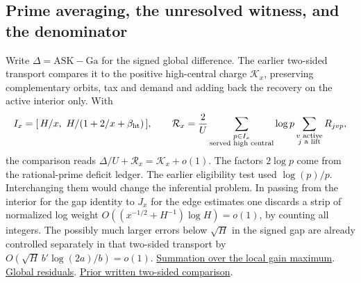 \subsection{Prime averaging, the unresolved witness, and the denominator}

Write \(\Delta=\mathrm{ASK}-\mathrm{Ga}\) for the signed global difference. The earlier two-sided transport compares it to the positive high-central charge \(\mathcal K_x\), preserving complementary orbits, tax and demand and adding back the recovery on the active interior only. With
\[
 I_x=[\,H/x,\ H/(1+2/x+\beta_{\rm ht})\,],\qquad
 \mathcal R_x=\frac{2}{U}\sum_{\substack{p\in I_x\\\text{served high central}}}
       \log p\sum_{\substack{v\text{ active}\\j\text{ a lift}}}R_{jvp},
\]
the comparison reads \(\Delta/U+\mathcal R_x=\mathcal K_x+o(1)\). The factors \(2\log p\) come from the rational-prime deficit ledger. The earlier eligibility test used \(\log(p)/p\). Interchanging them would change the inferential problem. In passing from the interior for the gap identity to \(J_x\) for the edge estimates one discards a strip of normalized log weight \(O((x^{-1/2}+H^{-1})\log H)=o(1)\), by counting all integers. The possibly much larger errors below \(\sqrt H\) in the signed gap are already controlled separately in that two-sided transport by \(O(\sqrt H\,b'\log(2a)/b)=o(1)\).
\href{https://github.com/nousentllc/riemann-hypothesis/blob/40e56bab026552e089d7afcfeff08d2defb9c005/src/Formalism/SharpRestriction/GrowthBounds/LogarithmicSums/NotSingularOfCentral.lean#L679-L728}{Summation over the local gain maximum}.
\href{https://github.com/nousentllc/riemann-hypothesis/blob/40e56bab026552e089d7afcfeff08d2defb9c005/src/Formalism/SizeWindowBrackets/ChainSlopeWindows/DiscriminantSettingSatisfied.lean#L162-L220}{Global residuals}.
\href{https://github.com/nousentllc/riemann-hypothesis/blob/3dedd2d81a54d046e3c12ef78df9d9fd0c2ad6dc/research/uriel/experiments/actual-gain-study/evidence/transport/TRANSPORT.md}{Prior written two-sided comparison}.

